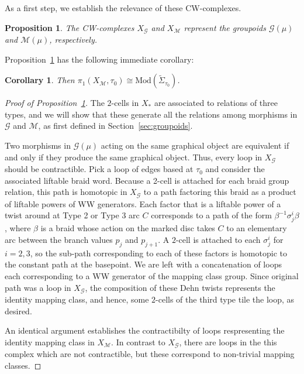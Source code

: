 \documentclass{amsart}
\newtheorem{corollary}[theorem]{Corollary}
\newtheorem{proposition}[theorem]{Proposition}
\theoremstyle{definition}
\def\ws{\widetilde{\Sigma}}
\begin{document}
As a first step, we establish the relevance of these CW-complexes.


\begin{proposition}\label{prop:repr} The CW-complexes $X_\mathcal{G}$ and $X_\mathcal{M}$ represent the groupoids $\mathcal{G}(\mu)$ and $\mathcal{M}(\mu)$, respectively. 
\end{proposition}


 Proposition~\ref{prop:repr} has the following immediate corollary:

\begin{corollary}\label{cor} Then $\pi_1(X_\mathcal{M}, \tau_0)\cong \text{Mod}(\ws_{\tau_0})$.  
\end{corollary}


\begin{proof}[Proof of Proposition~\ref{prop:repr}] The $2$-cells in $X_*$ are associated to relations of three types, and we will show that these generate all the relations among morphisms in $\mathcal{G}$ and $\mathcal{M}$, as first defined  in Section~\ref{sec:groupoids}. 

Two morphisms in $\mathcal{G}(\mu)$ acting on the same graphical object are equivalent if and only if they produce the same graphical object.   Thus, every loop in $X_\mathcal{G}$ should be contractible.  Pick a loop of edges based at $\tau_0$ and consider the associated liftable braid word.  Because a 2-cell is attached for each braid group relation, this path is homotopic in $X_\mathcal{G}$ to a path factoring this braid as a product of liftable powers of WW generators.  Each factor that is a liftable power of a twist around at Type 2 or Type 3 arc $C$ corresponds to a path of the form $\beta^{-1}\sigma_j^i\beta$, where $\beta$ is a braid whose action on the marked disc takes $C$ to an elementary arc between the branch values $p_j$ and $p_{j+1}$.  A $2$-cell is attached to each $\sigma_j^i$ for $i=2,3$, so the sub-path corresponding to each of these factors is homotopic to the constant path at the basepoint.  We are left with a concatenation of loops each corresponding to a WW generator of the  mapping class group.  Since original path was a loop in $X_\mathcal{G}$, the composition of these Dehn twists represents the identity mapping class, and hence, some $2$-cells of the third type tile the loop, as desired.

An identical argument establishes the contractibilty of loops respresenting the identity mapping class in $X_\mathcal{M}$. In contrast to $X_\mathcal{G}$, there are loops in the this complex which are not contractible, but these correspond to non-trivial mapping classes.
\end{proof}
\end{document}

